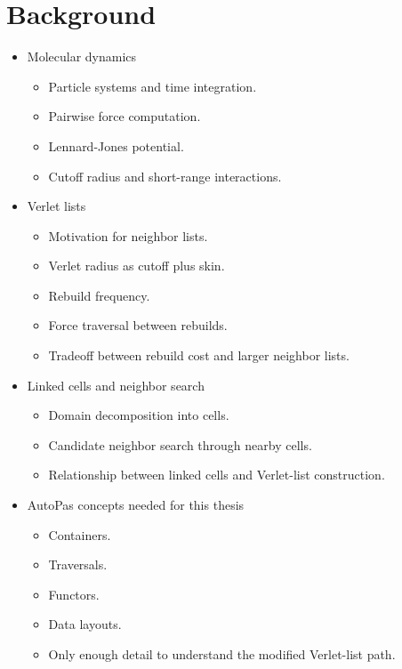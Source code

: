 \chapter{Background}
\label{ch:background}

\begin{itemize}
    \item Molecular dynamics
    \begin{itemize}
        \item Particle systems and time integration.
        \item Pairwise force computation.
        \item Lennard-Jones potential.
        \item Cutoff radius and short-range interactions.
    \end{itemize}

    \item Verlet lists
    \begin{itemize}
        \item Motivation for neighbor lists.
        \item Verlet radius as cutoff plus skin.
        \item Rebuild frequency.
        \item Force traversal between rebuilds.
        \item Tradeoff between rebuild cost and larger neighbor lists.
    \end{itemize}

    \item Linked cells and neighbor search
    \begin{itemize}
        \item Domain decomposition into cells.
        \item Candidate neighbor search through nearby cells.
        \item Relationship between linked cells and Verlet-list construction.
    \end{itemize}

    \item AutoPas concepts needed for this thesis
    \begin{itemize}
        \item Containers.
        \item Traversals.
        \item Functors.
        \item Data layouts.
        \item Only enough detail to understand the modified Verlet-list path.
    \end{itemize}


\end{itemize}
